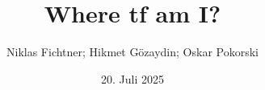\documentclass[oneside]{ausarbeitung}
\begin{document}


\Projektbericht

\Informatik

\title{Where tf am I?}

\author{Niklas Fichtner; Hikmet Gözaydin; Oskar Pokorski}

\examinerIsAProfessortrue   %


\date{20. Juli 2025}



\maketitle
\cleardoublepage

\setcounter{page}{1}


\makeaffirmation
\cleardoublepage

\makeconfidentialclause
\cleardoublepage
\end{document}
